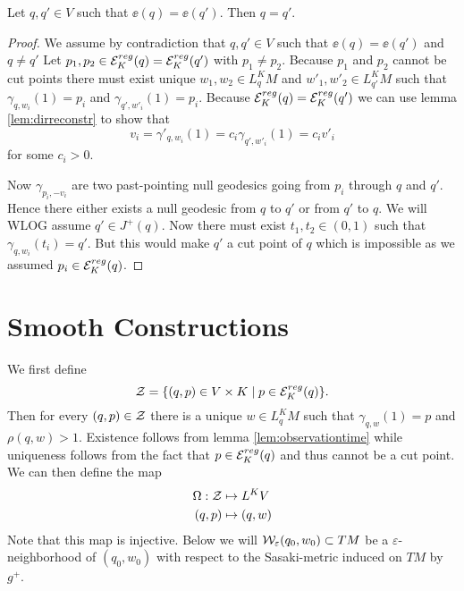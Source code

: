 \begin{proposition}\label{prop:einj}
    Let $q,q'\in V$ such that $\ee(q)=\ee(q')$. Then $q=q'$.
\end{proposition}
\begin{proof}
    We assume by contradiction that $q,q'\in V$ such that $\ee(q)=\ee(q')$ and $q\neq q'$
    Let $p_1, p_2 \in {{\mathcal{E}}^{reg}_K}(q)={{\mathcal{E}}^{reg}_K}(q')$ with $p_1\neq p_2$. Because $p_1$ and $p_2$ cannot be cut points there must exist unique $w_1,w_2\in L^K_qM$ and $w'_1,w'_2\in L^K_{q'}M$ such that $\gamma_{q,w_i}(1)=p_i$ and $\gamma_{q',w'_i}(1)=p_i$. Because ${{\mathcal{E}}^{reg}_K}(q)={{\mathcal{E}}^{reg}_K}(q')$ we can use lemma \ref{lem:dirreconstr} to show that 
    \[
        v_i = \gamma'_{q,w_i}(1) = c_i\gamma_{q',w'_i}(1)=c_iv'_i
    \] for some $c_i>0$.

    Now $\gamma_{p_i,-v_i}$ are two past-pointing null geodesics going from $p_i$ through $q$ and $q'$. Hence there either exists a null geodesic from $q$ to $q'$ or from $q'$ to $q$. We will WLOG assume $q'\in J^+(q)$. 
    Now there must exist $t_1, t_2 \in (0,1)$ such that $\gamma_{q,w_i}(t_i)=q'$. But this would make $q'$ a cut point of $q$ which is impossible as we assumed $p_i\in {{\mathcal{E}}^{reg}_K}(q)$.
\end{proof}


\section{Smooth Constructions}


\begin{definition}[Coordinates on $V$]
    We first define 
    \[
        {\mathcal{Z}} = \{(q,p)\in V\times K \mid p\in {\mathcal{E}}_K^{reg}(q)\}.
    \] 
    Then for every $(q,p)\in {\mathcal{Z}}$ there is a unique $w\in L^K_qM$ such that $\gamma_{q,w}(1)=p$ and $\rho(q,w)>1$. Existence follows from lemma \ref{lem:observationtime} while uniqueness follows from the fact that $p\in {\mathcal{E}}_K^{reg}(q)$ and thus cannot be a cut point. 
    We can then define the map
    \begin{align*}
        \Omega:{\mathcal{Z}}&\mapsto L^KV\\
        (q,p)&\mapsto (q,w)
    \end{align*}
    Note that this map is injective.
    Below we will ${\mathcal{W}}_\varepsilon(q_0,w_0)\subset TM$ be a $\varepsilon$-neighborhood of $(q_0,w_0)$ with respect to the Sasaki-metric induced on $TM$ by $g^+$.
\end{definition}

